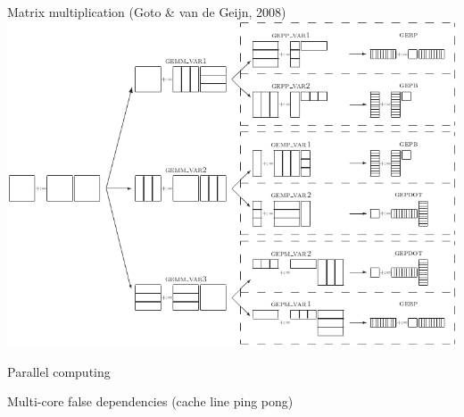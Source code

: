 \documentclass[sans,mathserif]{beamer}
\begin{document}
\begin{frame}{Matrix multiplication (Goto \& van de Geijn, 2008)}
\includegraphics[width=\textwidth]{goto_matmul.png}  
\end{frame}

\begin{frame}
  \begin{center}
    {\Large Parallel computing}
  \end{center}
\end{frame}

\begin{frame}{Multi-core false dependencies (cache line ping pong)}
\end{frame}

\end{document}
